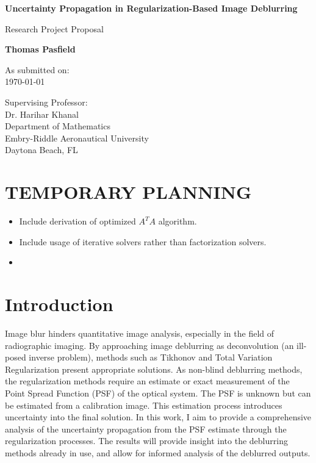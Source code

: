 \documentclass[letterpaper, 10pt, titlepage, twocolumn]{article}
\begin{document}
\begin{titlepage}
    \begin{center}
        \vspace*{1cm}

        \LARGE \textbf{Uncertainty Propagation in Regularization-Based Image Deblurring}

        \vspace{0.5cm}
        \Large Research Project Proposal
        
        \vspace{2.0cm}
        \large \textbf{Thomas Pasfield}

        \vspace{0.5cm}
        As submitted on:\\
        \today

        \vfill

        Supervising Professor:\\
        Dr. Harihar Khanal\\
        \vspace{1em}
        \normalsize Department of Mathematics\\
        Embry-Riddle Aeronautical University\\
        Daytona Beach, FL
    \end{center}
\end{titlepage}

\section*{TEMPORARY PLANNING}
\begin{itemize}
  \item Include derivation of optimized $A^T A$ algorithm.
  \item Include usage of iterative solvers rather than factorization solvers.
  \item 
\end{itemize}

\section*{Introduction}
Image blur hinders quantitative image analysis, especially in the field of radiographic imaging. By approaching image deblurring as deconvolution (an ill-posed inverse problem), methods such as Tikhonov and Total Variation Regularization present appropriate solutions. As non-blind deblurring methods, the regularization methods require an estimate or exact measurement of the Point Spread Function (PSF) of the optical system. The PSF is unknown but can be estimated from a calibration image. This estimation process introduces uncertainty into the final solution. In this work, I aim to provide a comprehensive analysis of the uncertainty propagation from the PSF estimate through the regularization processes. The results will provide insight into the deblurring methods already in use, and allow for informed analysis of the deblurred outputs.
\end{document}
